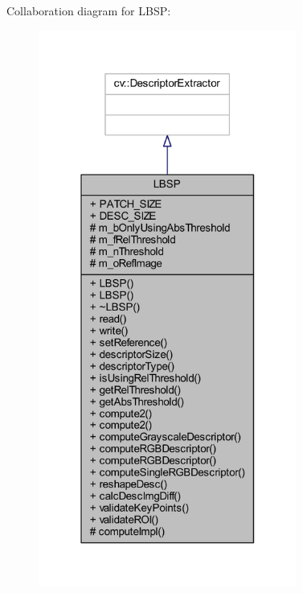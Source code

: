 Collaboration diagram for L\+B\+SP\+:\nopagebreak
\begin{figure}[H]
\begin{center}
\leavevmode
\includegraphics[width=241pt]{class_l_b_s_p__coll__graph}
\end{center}
\end{figure}
